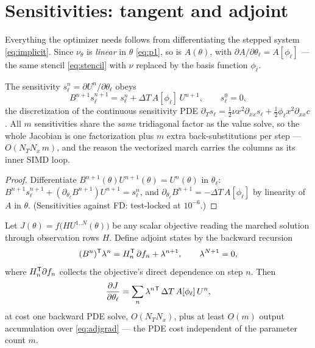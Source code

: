\documentclass[11pt]{article}
\begin{document}
\section{Sensitivities: tangent and adjoint}
\label{sec:sens}

Everything the optimizer needs follows from differentiating the stepped system
\eqref{eq:implicit}. Since $\nu_\theta$ is \emph{linear} in $\theta$
\eqref{eq:p1}, so is $A(\theta)$, with
$\partial A/\partial\theta_\ell=A[\phi_\ell]$ --- the same stencil
\eqref{eq:stencil} with $\nu$ replaced by the basis function $\phi_\ell$.

\begin{proposition}[Discrete tangent = same factor, extra right-hand sides]
\label{prop:tangent}
The sensitivity $s_\ell^n=\partial U^n/\partial\theta_\ell$ obeys
\begin{equation}
B^{n+1}s_\ell^{n+1}=s_\ell^{n}+\Delta T\,A[\phi_\ell]\,U^{n+1},
\qquad s_\ell^0=0,
\label{eq:tangent}
\end{equation}
the discretization of the continuous sensitivity PDE
$\partial_Ts_\ell=\tfrac12\nu x^2\partial_{xx}s_\ell+\tfrac12\phi_\ell
x^2\partial_{xx}c$. All $m$ sensitivities share the \emph{same} tridiagonal
factor as the value solve, so the whole Jacobian is one factorization plus $m$
extra back-substitutions per step --- $O(N_TN_x\,m)$, and the reason the
vectorized march carries the columns as its inner SIMD loop.
\end{proposition}

\begin{proof}
Differentiate $B^{n+1}(\theta)U^{n+1}(\theta)=U^n(\theta)$ in $\theta_\ell$:
$B^{n+1}s^{n+1}_\ell+(\partial_{\theta_\ell}B^{n+1})U^{n+1}=s^n_\ell$, and
$\partial_{\theta_\ell}B^{n+1}=-\Delta T\,A[\phi_\ell]$ by linearity of
$A$ in $\theta$. (Sensitivities against FD: test-locked at $10^{-6}$.)
\end{proof}

\begin{proposition}[Discrete adjoint = one backward sweep]
\label{prop:adjoint}
Let $J(\theta)=f\big(HU^{1..N}(\theta)\big)$ be any scalar objective reading
the marched solution through observation rows $H$. Define adjoint states by the
backward recursion
\begin{equation}
(B^{n})^{\mathsf{T}}\lambda^{n}=H_n^{\mathsf{T}}\,\partial f_n+\lambda^{n+1},
\qquad \lambda^{N+1}=0,
\label{eq:adjoint}
\end{equation}
where $H_n^{\mathsf{T}}\partial f_n$ collects the objective's direct dependence on step
$n$. Then
\begin{equation}
\frac{\partial J}{\partial\theta_\ell}
=\sum_{n}\lambda^{n}{}^{\mathsf{T}}\,\Delta T\,A[\phi_\ell]\,U^{n},
\label{eq:adjgrad}
\end{equation}
at cost one backward PDE solve, $O(N_TN_x)$, plus at least $O(m)$ output
accumulation over \eqref{eq:adjgrad} --- the PDE cost independent of the
parameter count $m$.
\end{proposition}
\end{document}
